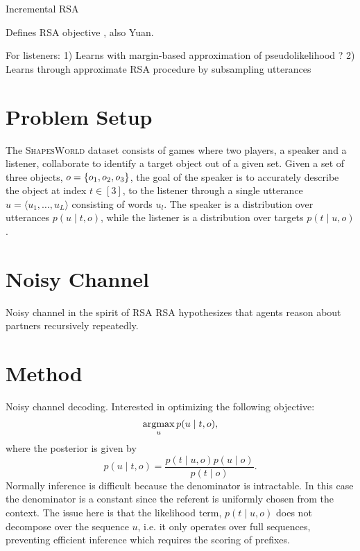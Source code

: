 \documentclass[11pt,a4paper]{article}
\begin{document}
Incremental RSA
\citep{cohngordon2018pragmatically}

Defines RSA objective \citep{zaslavsky2020ratedistortion}, also Yuan.

For listeners:
1) Learns with margin-based approximation of pseudolikelihood \citep{gulordava2020dax}?
2) Learns through approximate RSA procedure by subsampling utterances \citep{mcdowell2019learning}


\section{Problem Setup}
The \textsc{ShapesWorld} dataset consists of games where two players,
a speaker and a listener, collaborate to identify a target object out of a given set.
Given a set of three objects, $o = \left\{o_1,o_2,o_3\right\}$, the goal of the speaker
is to accurately describe the object at index $t\in [3]$,
to the listener through a single utterance
$u = \langle u_1, \ldots, u_L \rangle$ consisting of words $u_l$.
The speaker is a distribution over utterances $p(u \mid t, o)$, while
the listener is a distribution over targets $p(t \mid u, o)$.

\section{Noisy Channel}
Noisy channel in the spirit of RSA
RSA hypothesizes that agents reason about partners recursively repeatedly.

\section{Method}
Noisy channel decoding.
Interested in optimizing the following objective:
\begin{equation}
\label{eqn:obj}
\operatorname*{argmax}_u p(u \mid t,o),
\end{equation}
where the posterior is given by
\begin{equation}
p(u\mid t, o) = \frac{p(t \mid u, o)p(u \mid o)}{p(t \mid o)}.
\end{equation}
Normally inference is difficult because the denominator is intractable.
In this case the denominator is a constant
since the referent is uniformly chosen from the context.
The issue here is that the likelihood term, $p(t \mid u, o)$ does not decompose over 
the sequence $u$, i.e. it only operates over full sequences, preventing efficient inference
which requires the scoring of prefixes.
\end{document}

